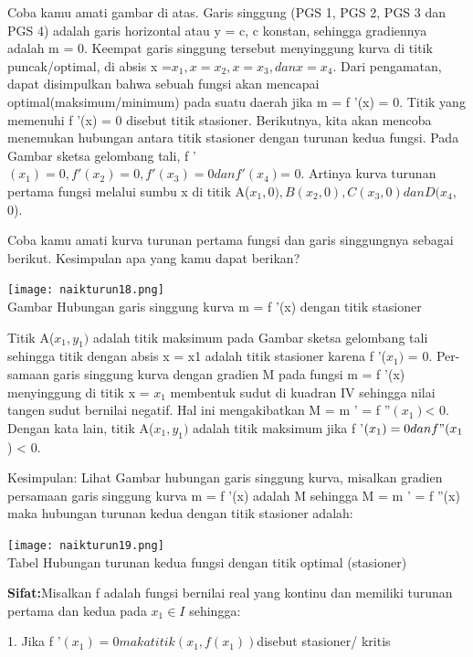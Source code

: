 \documentclass[11pt,fleqn]{book} %
\begin{document}
Coba kamu amati gambar di atas. Garis singgung
(PGS 1, PGS 2, PGS 3 dan PGS 4) adalah garis horizontal atau y = c, c konstan, sehingga gradiennya
adalah m = 0. Keempat garis singgung tersebut menyinggung kurva di titik puncak/optimal, di absis x =$ x_{1}, x = x_{2}, x = x_{3}, dan x = x_{4}$. Dari pengamatan, dapat disimpulkan bahwa sebuah fungsi akan mencapai optimal(maksimum/minimum) pada suatu daerah jika m = f '(x) = 0. Titik yang memenuhi f '(x) = 0 disebut titik stasioner. Berikutnya, kita akan mencoba menemukan hubungan antara titik stasioner dengan turunan kedua fungsi. Pada Gambar sketsa gelombang tali, f '$(x_{1}) = 0, f '(x_{2}) = 0, f '(x_{3}) = 0 dan f '(x_{4}) $= 0. Artinya kurva turunan pertama fungsi melalui sumbu x di titik A($x_{1}, 0), B(x_{2}, 0), C(x_{3}, 0) dan D(x_{4}$, 0).

Coba kamu amati kurva turunan pertama fungsi dan
garis singgungnya sebagai berikut. Kesimpulan apa
yang kamu dapat berikan?

\begin{center}
\texttt{[image: naikturun18.png]}\\
Gambar Hubungan garis singgung kurva m = f '(x)
dengan titik stasioner
\end{center}

Titik A($x_{1}, y_{1})$ adalah titik maksimum pada Gambar sketsa gelombang tali sehingga titik dengan absis x = x1 adalah titik stasioner karena f '($x_{1})$ = 0. Per-samaan garis singgung kurva dengan gradien M pada fungsi m = f '(x) menyinggung di titik x = $x_{1}$ membentuk sudut di kuadran IV sehingga nilai tangen sudut bernilai negatif. Hal ini mengakibatkan M = m ' = f ''$(x_{1}) $< 0. Dengan kata lain, titik A($x_{1}, y_{1})$ adalah titik maksimum jika f '$(x_{1}) = 0 dan f "(x_{1}$) < 0.

Kesimpulan: Lihat Gambar hubungan garis singgung kurva, misalkan gradien persamaan garis singgung kurva m = f '(x) adalah M sehingga M = m ' = f ''(x) maka hubungan turunan kedua dengan titik stasioner adalah:

\begin{center}
\texttt{[image: naikturun19.png]}\\
Tabel Hubungan turunan kedua fungsi dengan
titik optimal (stasioner)
\end{center}

\textbf{Sifat:}Misalkan f adalah fungsi bernilai real yang kontinu
dan memiliki turunan pertama dan kedua pada $x_{1} \in I$
sehingga:

1. Jika f '$(x_{1}) = 0 maka titik (x_{1}, f(x_{1}))$disebut stasioner/
kritis
\end{document}
